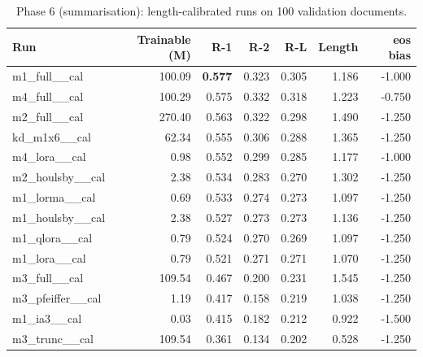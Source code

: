 \begin{table}[t]
\centering\small
\begin{tabular}{lrrrrrr}
\toprule
Run & Trainable (M) & R-1 & R-2 & R-L & Length & eos bias \\
\midrule
m1\_full\_\_cal & 100.09 & \textbf{0.577} & 0.323 & 0.305 & 1.186 & -1.000 \\
m4\_full\_\_cal & 100.29 & 0.575 & 0.332 & 0.318 & 1.223 & -0.750 \\
m2\_full\_\_cal & 270.40 & 0.563 & 0.322 & 0.298 & 1.490 & -1.250 \\
kd\_m1x6\_\_cal & 62.34 & 0.555 & 0.306 & 0.288 & 1.365 & -1.250 \\
m4\_lora\_\_cal & 0.98 & 0.552 & 0.299 & 0.285 & 1.177 & -1.000 \\
m2\_houlsby\_\_cal & 2.38 & 0.534 & 0.283 & 0.270 & 1.302 & -1.250 \\
m1\_lorma\_\_cal & 0.69 & 0.533 & 0.274 & 0.273 & 1.097 & -1.250 \\
m1\_houlsby\_\_cal & 2.38 & 0.527 & 0.273 & 0.273 & 1.136 & -1.250 \\
m1\_qlora\_\_cal & 0.79 & 0.524 & 0.270 & 0.269 & 1.097 & -1.250 \\
m1\_lora\_\_cal & 0.79 & 0.521 & 0.271 & 0.271 & 1.070 & -1.250 \\
m3\_full\_\_cal & 109.54 & 0.467 & 0.200 & 0.231 & 1.545 & -1.250 \\
m3\_pfeiffer\_\_cal & 1.19 & 0.417 & 0.158 & 0.219 & 1.038 & -1.250 \\
m1\_ia3\_\_cal & 0.03 & 0.415 & 0.182 & 0.212 & 0.922 & -1.500 \\
m3\_trunc\_\_cal & 109.54 & 0.361 & 0.134 & 0.202 & 0.528 & -1.250 \\
\bottomrule
\end{tabular}
\caption{Phase 6 (summarisation): length-calibrated runs on 100 validation documents.}
\label{tab:p6}
\end{table}
